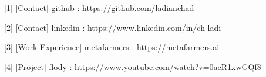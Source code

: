 \documentclass{article}
\begin{document}



\vfill

\color{gray}[1] [Contact] github : \hfill https://github.com/ladianchad

\color{gray}[2] [Contact] linkedin : \hfill https://www.linkedin.com/in/ch-ladi

\color{gray}[3] [Work Experience] metafarmers : \hfill https://metafarmers.ai

\color{gray}[4] [Project] flody : \hfill https://www.youtube.com/watch?v=0acR1xwGQf8
\end{document}
